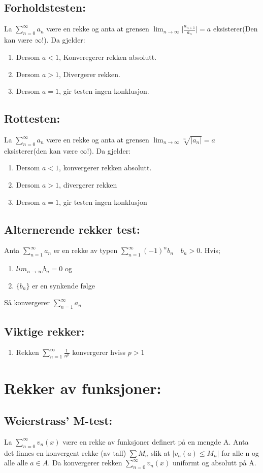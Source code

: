 \documentclass[8pt,a4paper,twocolumn,twoside]{article}
\def\abs#1{\lvert #1 \rvert}
\def\suminfty#1#2{\sum_{n=#1}^\infty #2}
\begin{document}
        \subsection*{Forholdstesten:}
        La $\suminfty{0}{a_n}$ være en rekke og anta at grensen $\lim_{n\to\infty}\abs{\frac{a_{n+1}}{a_n}}=a$ eksisterer(Den kan være $\infty$!). Da gjelder:
        \begin{enumerate}
            \item Dersom $a<1$, Konveregerer rekken absolutt.
            \item Dersom $a>1$, Divergerer rekken.
            \item Dersom $a=1$, gir testen ingen konklusjon.
        \end{enumerate}
        \subsection*{Rottesten:}
        La $\suminfty{0}{a_n}$ være en rekke og anta at grensen $\lim_{n\to\infty}\sqrt[n]{\abs{a_n}}=a$ eksisterer(den kan være $\infty$!). Da gjelder:
        \begin{enumerate}
            \item Dersom $a<1$, konvergerer rekken absolutt.
            \item Dersom $a>1$, divergerer rekken
            \item Dersom $a=1$, gir testen ingen konklusjon
        \end{enumerate}
        \subsection*{Alternerende rekker test:}
        Anta $\suminfty{1}{a_n}$ er en rekke av typen $\suminfty{1}{(-1)^n b_n}\quad b_n>0$. Hvis;
        \begin{enumerate}
            \item $lim_{n\to\infty}b_n=0$ og
            \item $\{b_n\}$ er en synkende følge
        \end{enumerate}
        Så konvergerer $\suminfty{1}{a_n}$
        \subsection*{Viktige rekker:}
        \begin{enumerate}
            \item Rekken $\sum_{n=1}^\infty \frac{1}{n^p}$ konvergerer hviss $p > 1$ 
        \end{enumerate}
    \section*{Rekker av funksjoner:}
        \subsection*{Weierstrass' M-test:}
        La $\suminfty{0}{v_n(x)}$ være en rekke av funksjoner definert på en mengde A. Anta det finnes en konvergent rekke (av tall) $\sum M_n$ slik at 
        $\abs{v_n(a) \leq M_n}$ for alle n og alle alle $a\in A$. Da konvergerer rekken $\suminfty{0}{v_n(x)}$ uniformt og absolutt på A.
\end{document}
